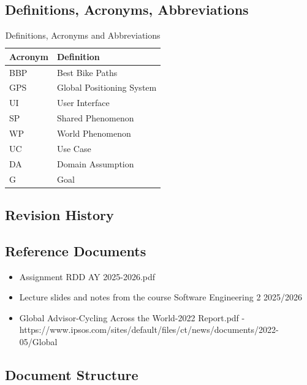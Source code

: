 \subsection{Definitions, Acronyms, Abbreviations}

\begin{table}[H]
   \begin{tabular}{|p{3cm}|p{12cm}|}
   \hline
   \textbf{Acronym} & \textbf{Definition} \\ \hline
   BBP & Best Bike Paths \\ \hline
   GPS & Global Positioning System \\ \hline
   UI & User Interface \\ \hline
   SP & Shared Phenomenon \\ \hline
   WP & World Phenomenon \\ \hline
   UC & Use Case \\ \hline
   DA & Domain Assumption \\ \hline
   G & Goal \\ \hline
   \end{tabular}
   \caption{Definitions, Acronyms and Abbreviations}
\end{table}

\subsection{Revision History}
\subsection{Reference Documents}

\begin{itemize}
   \item Assignment RDD AY 2025-2026.pdf
   \item Lecture slides and notes from the course Software Engineering 2 2025/2026
   \item Global Advisor-Cycling Across the World-2022 Report.pdf - \newline https://www.ipsos.com/sites/default/files/ct/news/documents/2022-05/Global%
\end{itemize}

\subsection{Document Structure}

